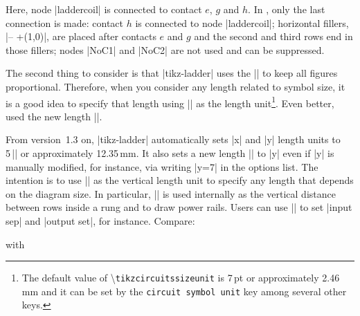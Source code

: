 \documentclass[a4paper]{ltxdoc}
\begin{document}
\noindent{}Here, node |laddercoil| is connected to contact $e$, $g$ and $h$. In \tikzname, only the last connection is made: contact $h$ is connected to node |laddercoil|; horizontal fillers, |-- +(1,0)|, are placed after contacts $e$ and $g$ and the second and third rows end in those fillers; nodes |NoC1| and |NoC2| are not used and can be suppressed.

The second thing to consider is that |tikz-ladder| uses the |\tikzcircuitssizeunit| to keep all figures proportional. Therefore, when you consider any length related to symbol size, it is a good idea to specify that length using |\tikzcircuitssizeunit| as the length unit\footnote{The default value of \textbackslash\verb|tikzcircuitssizeunit| is 7\,pt or approximately 2.46\,mm and it can be set by the \verb|circuit symbol unit| key among several other keys.}. Even better, used the new length |\ladderskip|. 

From version~1.3 on, |tikz-ladder| automatically sets |x| and |y| length units to 5\,|\tikzcircuitssizeunit| or approximately 12.35\,mm. It also sets a new length |\ladderskip| to |y| even if |y| is manually modified, for instance, via writing |y=7\tikzcircuitssizeunit| in the options list. The intention is to use |\ladderskip| as the vertical length unit to specify any length that depends on the diagram size. In particular, |\ladderskip| is used internally as the vertical distance between rows inside a rung and to draw power rails. Users can use |\ladderskip| to set |input sep| and |output set|, for instance. Compare:

\begin{codeexample}[width=4cm]
\end{codeexample}

\noindent{}with

\begin{codeexample}[width=4cm]
\end{codeexample}
\end{document}

